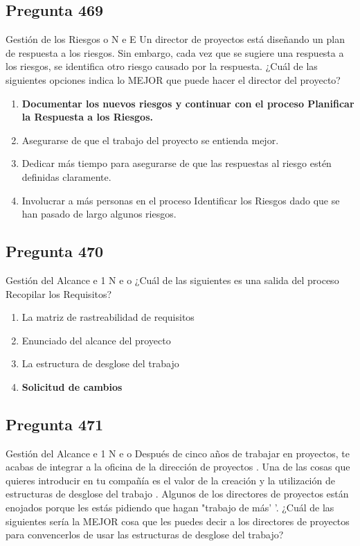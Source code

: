 \documentclass[11pt,a4paper]{article}
\begin{document}
\subsection*{Pregunta 469}
Gestión de los Riesgos o N e E Un director de proyectos está diseñando un plan de respuesta a los riesgos. Sin embargo, cada vez que se sugiere una respuesta a los riesgos, se identifica otro riesgo causado por la respuesta. ¿Cuál de las siguientes opciones indica lo MEJOR que puede hacer el director del proyecto?

\begin{enumerate}[label=\alph*)]
  \item \textbf{Documentar los nuevos riesgos y continuar con el proceso Planificar la Respuesta a los Riesgos.}
  \item Asegurarse de que el trabajo del proyecto se entienda mejor.
  \item Dedicar más tiempo para asegurarse de que las respuestas al riesgo estén definidas claramente.
  \item Involucrar a más personas en el proceso Identificar los Riesgos dado que se han pasado de largo algunos riesgos.
\end{enumerate}

\subsection*{Pregunta 470}
Gestión del Alcance e 1 N e o ¿Cuál de las siguientes es una salida del proceso Recopilar los Requisitos?

\begin{enumerate}[label=\alph*)]
  \item La matriz de rastreabilidad de requisitos
  \item Enunciado del alcance del proyecto
  \item La estructura de desglose del trabajo
  \item \textbf{Solicitud de cambios}
\end{enumerate}

\subsection*{Pregunta 471}
Gestión del Alcance e 1 N e o Después de cinco años de trabajar en proyectos, te acabas de integrar a la oficina de la dirección de proyectos . Una de las cosas que quieres introducir en tu compañía es el valor de la creación y la utilización de estructuras de desglose del trabajo . Algunos de los directores de proyectos están enojados porque les estás pidiendo que hagan "trabajo de más' '. ¿Cuál de las siguientes sería la MEJOR cosa que les puedes decir a los directores de proyectos para convencerlos de usar las estructuras de desglose del trabajo?
\end{document}
